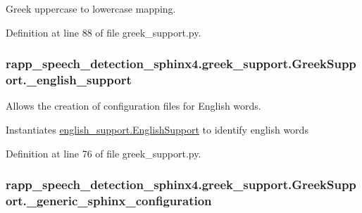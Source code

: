 Greek uppercase to lowercase mapping. 



Definition at line 88 of file greek\-\_\-support.\-py.

\hypertarget{classrapp__speech__detection__sphinx4_1_1greek__support_1_1GreekSupport_aff5fd96d6423b28163b900c2ea06e188}{
\subsubsection[{\-\_\-english\-\_\-support}]{\setlength{\rightskip}{0pt plus 5cm}rapp\-\_\-speech\-\_\-detection\-\_\-sphinx4.\-greek\-\_\-support.\-Greek\-Support.\-\_\-english\-\_\-support\hspace{0.3cm}{\ttfamily [private]}}}\label{classrapp__speech__detection__sphinx4_1_1greek__support_1_1GreekSupport_aff5fd96d6423b28163b900c2ea06e188}


Allows the creation of configuration files for English words. 

Instantiates \hyperlink{classrapp__speech__detection__sphinx4_1_1english__support_1_1EnglishSupport}{english\-\_\-support.\-English\-Support} to identify english words 

Definition at line 76 of file greek\-\_\-support.\-py.

\hypertarget{classrapp__speech__detection__sphinx4_1_1greek__support_1_1GreekSupport_a1c206d8793dce070075c50b4e0800a16}{
\subsubsection[{\-\_\-generic\-\_\-sphinx\-\_\-configuration}]{\setlength{\rightskip}{0pt plus 5cm}rapp\-\_\-speech\-\_\-detection\-\_\-sphinx4.\-greek\-\_\-support.\-Greek\-Support.\-\_\-generic\-\_\-sphinx\-\_\-configuration\hspace{0.3cm}{\ttfamily [private]}}}\label{classrapp__speech__detection__sphinx4_1_1greek__support_1_1GreekSupport_a1c206d8793dce070075c50b4e0800a16}


